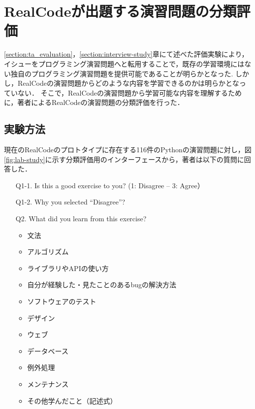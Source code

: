 
\chapter{RealCodeが出題する演習問題の分類評価}
\label{section:lab-study}
\graphicspath{{Chapters_evaluation/Figs/}}


\ref{section:ta_evaluation}，\ref{section:interview-study}章にて述べた評価実験により，イシューをプログラミング演習問題へと転用することで，既存の学習環境にはない独自のプログラミング演習問題を提供可能であることが明らかとなった.
しかし，RealCodeの演習問題からどのような内容を学習できるのかは明らかとなっていない．
そこで，RealCodeの演習問題から学習可能な内容を理解するために，著者によるRealCodeの演習問題の分類評価を行った．


\section{実験方法}

現在のRealCodeのプロトタイプに存在する116件のPythonの演習問題に対し，図\ref{fig:lab-study}に示す分類評価用のインターフェースから，著者は以下の質問に回答した．

\begin{itemize}
  \item[Q1-1.] Is this a good exercise to you? (1: Disagree -- 3: Agree）
  \item[Q1-2.] Why you selected ``Disagree''?
  \item[Q2.] What did you learn from this exercise?
  \begin{itemize}
  	  \item 文法
   	  \item アルゴリズム
      \item ライブラリやAPIの使い方
      \item 自分が経験した・見たことのあるbugの解決方法
      \item ソフトウェアのテスト
      \item デザイン
      \item ウェブ
      \item データベース
      \item 例外処理
      \item メンテナンス
      \item その他学んだこと（記述式）
  \end{itemize}
\end{itemize}

